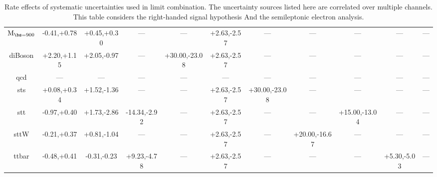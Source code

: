 \begin{table}
\begin{center}
\begin{small}
{\begin{tabular}{c||c|c|c|c|c|c|c|c|c|c}
$\mathrm{M_{\bs=900}}$ & -0.41,+0.78 & +0.45,+0.30 & --- & --- & +2.63,-2.57 & --- & --- & --- & --- & ---\\  
diBoson & +2.20,+1.15 & +2.05,-0.97 & --- & +30.00,-23.08 & +2.63,-2.57 & --- & --- & --- & --- & ---\\  
qcd & --- & --- & --- & --- & --- & --- & --- & --- & --- & ---\\  
sts & +0.08,+0.34 & +1.52,-1.36 & --- & --- & +2.63,-2.57 & +30.00,-23.08 & --- & --- & --- & ---\\  
stt & -0.97,+0.40 & +1.73,-2.86 & -14.34,-2.92 & --- & +2.63,-2.57 & --- & --- & +15.00,-13.04 & --- & ---\\  
sttW & -0.21,+0.37 & +0.81,-1.04 & --- & --- & +2.63,-2.57 & --- & +20.00,-16.67 & --- & --- & ---\\  
ttbar & -0.48,+0.41 & -0.31,-0.23 & +9.23,-4.78 & --- & +2.63,-2.57 & --- & --- & --- & +5.30,-5.03 & ---\\ 
\hline
\end{tabular}
}
\caption{Rate effects of systematic uncertainties used in limit combination.  The uncertainty sources listed here are correlated over multiple channels.  This table considers the right-handed signal hypothesis
And the semileptonic electron analysis.}
\label{table:bsRsysCoSe}

\end{small}
\end{center}
\end{table}




